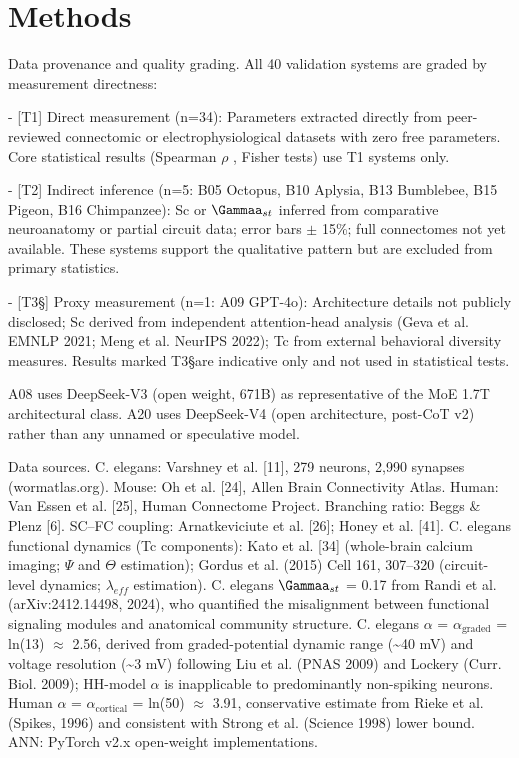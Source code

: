 \documentclass[a4paper,12pt]{article}
\begin{document}
\section{Methods}

Data provenance and quality grading. All 40 validation systems are graded by measurement directness:

- [T1] Direct measurement (n=34): Parameters extracted directly from peer-reviewed connectomic or electrophysiological datasets with zero free parameters. Core statistical results (Spearman  $\rho$ , Fisher tests) use T1 systems only.

- [T2\dag] Indirect inference (n=5: B05 Octopus, B10 Aplysia, B13 Bumblebee, B15 Pigeon, B16 Chimpanzee): Sc or $\Gammaa_{st}$ inferred from comparative neuroanatomy or partial circuit data; error bars  $\pm$ 15\%; full connectomes not yet available. These systems support the qualitative pattern but are excluded from primary statistics.

- [T3\S] Proxy measurement (n=1: A09 GPT-4o): Architecture details not publicly disclosed; Sc derived from independent attention-head analysis (Geva et al. EMNLP 2021; Meng et al. NeurIPS 2022); Tc from external behavioral diversity measures. Results marked T3\S are indicative only and not used in statistical tests.

A08 uses DeepSeek-V3 (open weight, 671B) as representative of the MoE 1.7T architectural class. A20 uses DeepSeek-V4 (open architecture, post-CoT v2) rather than any unnamed or speculative model.

Data sources.
C. elegans: Varshney et al. [11], 279 neurons, 2,990 synapses (wormatlas.org).
Mouse: Oh et al. [24], Allen Brain Connectivity Atlas.
Human: Van Essen et al. [25], Human Connectome Project.
Branching ratio: Beggs \& Plenz [6].
SC--FC coupling: Arnatkeviciute et al. [26]; Honey et al. [41].
C. elegans functional dynamics (Tc components): Kato et al. [34] (whole-brain calcium imaging;  $\Psi$  and $\Theta$ estimation); Gordus et al. (2015) Cell 161, 307--320 (circuit-level dynamics; $\lambda_{eff}$ estimation).
C. elegans $\Gammaa_{st}$ = 0.17 from Randi et al. (arXiv:2412.14498, 2024), who quantified the misalignment between functional signaling modules and anatomical community structure.
C. elegans  $\alpha$  = $\alpha_{\text{graded}}$ = ln(13)  $\approx$  2.56, derived from graded-potential dynamic range (\textasciitilde{}40 mV) and voltage resolution (\textasciitilde{}3 mV) following Liu et al. (PNAS 2009) and Lockery (Curr.
Biol. 2009); HH-model  $\alpha$  is inapplicable to predominantly non-spiking neurons.
Human  $\alpha$  = $\alpha_{\text{cortical}}$ = ln(50)  $\approx$  3.91, conservative estimate from Rieke et al. (Spikes, 1996) and consistent with Strong et al. (Science 1998) lower bound.
ANN: PyTorch v2.x open-weight implementations.
\end{document}
